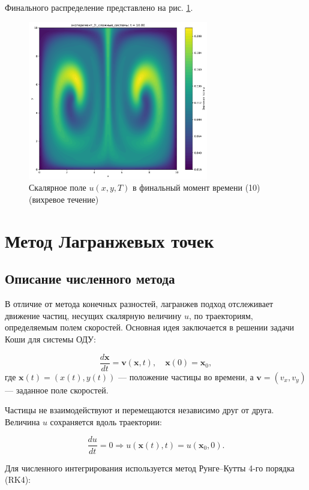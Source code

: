 Финального распределение представлено на рис. \ref{fig:div_final}.
\begin{figure}
	\centering
	\includegraphics[width=0.7\textwidth]{imgs/эксперимент_3:_сложные_системы_t10.00.png}
	\caption{Скалярное поле \(u(x,y,T)\) в финальный момент времени (10) (вихревое течение)}
	\label{fig:div_final}
\end{figure}

\newpage

\section{Метод Лагранжевых точек}
\subsection{Описание численного метода}

В отличие от метода конечных разностей, лагранжев подход отслеживает движение частиц, несущих скалярную величину \( u \), по траекториям, определяемым полем скоростей. Основная идея заключается в решении задачи Коши для системы ОДУ:

\[
\frac{d \mathbf{x}}{dt} = \mathbf{v}(\mathbf{x}, t), \quad \mathbf{x}(0) = \mathbf{x}_0,
\]
где \( \mathbf{x}(t) = (x(t), y(t)) \) — положение частицы во времени, а \( \mathbf{v} = (v_x, v_y) \) — заданное поле скоростей.

Частицы не взаимодействуют и перемещаются независимо друг от друга. Величина \( u \) сохраняется вдоль траектории:

\[
\frac{du}{dt} = 0 \Rightarrow u(\mathbf{x}(t), t) = u(\mathbf{x}_0, 0).
\]

Для численного интегрирования используется метод Рунге–Кутты 4-го порядка (RK4):

